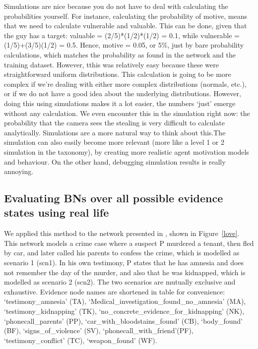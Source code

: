 \documentclass[12pt]{article}
\begin{document}
Simulations are nice because you do not have to deal with calculating the probabilities yourself. For instance, calculating the probability of motive, means that we need to calculate vulnerable and valuable. This can be done, given that the guy has a target: valuable = (2/5)*(1/2)*(1/2) = 0.1, while vulnerable = (1/5)+(3/5)(1/2) = 0.5. Hence, motive = 0.05, or 5\%, just by bare probability calculations, which matches the probability as found in the network and the training dataset. However, tthis was relatively easy because these were straightforward uniform distributions. This calculation is going to be more complex if we're dealing with either more complex distributions (normals, etc.), or if we do not have a good idea about the underlying distributions. However, doing this using simulations makes it a lot easier, the numbers `just' emerge without any calculation. We even encounter this in the simulation right now: the probability that the camera sees the stealing is very difficult to calculate analytically. Simulations are a more natural way to think about this.The simulation can also easily become more relevant (more like a level 1 or 2 simulation in the taxonomy), by creating more realistic agent motivation models and behaviour. On the other hand, debugging simulation results is really annoying.





\subsection{Evaluating BNs over all possible evidence states using real life}

We applied this method to the network presented in \citet{vanLeeuwen2019}, shown in Figure~\ref{love}.  This network models a crime case where a suspect P murdered a tenant, then fled by car, and later called his parents to confess the crime, which is modelled as scenario 1 (scn1). In his own testimony, P states that he has amnesia and does not remember the day of the murder, and also that he was kidnapped, which is modelled as scenario 2 (scn2). The two scenarios are mutually exclusive and exhaustive. Evidence node names are shortened in table for convenience: `testimony\_amnesia' (TA), `Medical\_investigation\_found\_no\_amnesia' (MA), `testimony\_kidnapping' (TK), `no\_concrete\_evidence\_for\_kidnapping' (NK), `phonecall\_parents' (PP),  `car\_with\_bloodstains\_found' (CB), `body\_found' (BF), `signs\_of\_violence' (SV), `phonecall\_with\_friend'(PF), `testimony\_conflict' (TC), `weapon\_found' (WF).
\end{document}
